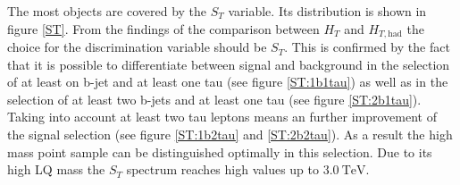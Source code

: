 %
The most objects are covered by the $S_T$ variable. Its distribution is shown in figure \ref{ST}. From the findings of the comparison between $H_T$ and $H_{T,\text{had}}$ the choice for the discrimination variable should be $S_T$. This is confirmed by the fact that it is possible to differentiate between signal and background in the selection of at least on b-jet and at least one tau (see figure \ref{ST:1b1tau}) as well as in the selection of at least two b-jets and at least one tau (see figure \ref{ST:2b1tau}). Taking into account at least two tau leptons means an further improvement of the signal selection (see figure \ref{ST:1b2tau} and \ref{ST:2b2tau}). As a result the high mass point sample can be distinguished optimally in this selection. Due to its high LQ mass the $S_T$ spectrum reaches high values up to $\SI{3.0}{\tera\electronvolt}$. \par
%

